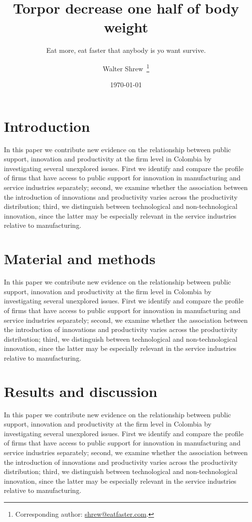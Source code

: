 \title{Torpor decrease one half of body weight}
\subtitle{Eat more, eat faster that anybody is yo want survive.}
\author{Walter Shrew\,
\thanks{Corresponding author: \href{mailto:shrew@eatfaster.com}{shrew@eatfaster.com}.}}
\date{\today}
\maketitle
\section{Introduction}
In this paper we contribute new evidence on the relationship between public support, innovation and productivity at the firm level in Colombia by investigating several unexplored issues. First we identify and compare the profile of firms that have access to public support for innovation in manufacturing and service industries separately; second, we examine whether the association between the introduction of innovations and productivity varies across the productivity distribution; third, we distinguish between technological and non-technological innovation, since the latter may be especially relevant in the service industries relative to manufacturing.
\section{Material and methods}
In this paper we contribute new evidence on the relationship between public support, innovation and productivity at the firm level in Colombia by investigating several unexplored issues. First we identify and compare the profile of firms that have access to public support for innovation in manufacturing and service industries separately; second, we examine whether the association between the introduction of innovations and productivity varies across the productivity distribution; third, we distinguish between technological and non-technological innovation, since the latter may be especially relevant in the service industries relative to manufacturing.
\section{Results and discussion}
In this paper we contribute new evidence on the relationship between public support, innovation and productivity at the firm level in Colombia by investigating several unexplored issues. First we identify and compare the profile of firms that have access to public support for innovation in manufacturing and service industries separately; second, we examine whether the association between the introduction of innovations and productivity varies across the productivity distribution; third, we distinguish between technological and non-technological innovation, since the latter may be especially relevant in the service industries relative to manufacturing.

